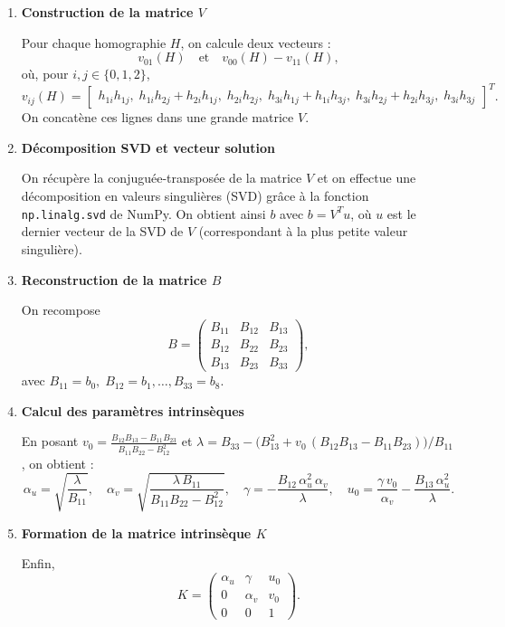 \documentclass[12pt]{article}
\begin{document}
\begin{enumerate}
    \item \textbf{Construction de la matrice \(V\)}

    Pour chaque homographie \(H\), on calcule deux vecteurs :
    \[
        v_{01}(H) \quad\text{et}\quad v_{00}(H) - v_{11}(H),
    \]
    où, pour \(i,j\in\{0,1,2\}\),
    \[
        v_{ij}(H) =
        \begin{bmatrix}
        h_{1i}h_{1j},\;
        h_{1i}h_{2j}+h_{2i}h_{1j},\;
        h_{2i}h_{2j},\;
        h_{3i}h_{1j}+h_{1i}h_{3j},\;
        h_{3i}h_{2j}+h_{2i}h_{3j},\;
        h_{3i}h_{3j}
        \end{bmatrix}^T.
    \]
    On concatène ces lignes dans une grande matrice $V$.
    \linebreak

    \item \textbf{Décomposition SVD et vecteur solution}  
    
    On récupère la conjuguée-transposée de la matrice \(V\) et on effectue une décomposition en valeurs singulières (SVD) grâce à la fonction \texttt{np.linalg.svd} de NumPy.
    On obtient ainsi \(b\) avec \(b = V^T u\), où \(u\) est le dernier vecteur de la SVD de \(V\) (correspondant à la plus petite valeur singulière).
    \linebreak

    \item \textbf{Reconstruction de la matrice \(B\)}  
    
    On recompose
    \[
        B = 
        \begin{pmatrix}
        B_{11} & B_{12} & B_{13} \\
        B_{12} & B_{22} & B_{23} \\
        B_{13} & B_{23} & B_{33}
        \end{pmatrix},
    \]
    avec \(B_{11}=b_0,\;B_{12}=b_1,\ldots,B_{33}=b_8\).
    \linebreak

    \item \textbf{Calcul des paramètres intrinsèques}  
    
    En posant \(v_0=\frac{B_{12}B_{13}-B_{11}B_{23}}{B_{11}B_{22}-B_{12}^2}\) et
    \(\lambda = B_{33} - \bigl(B_{13}^2 + v_0\,(B_{12}B_{13}-B_{11}B_{23})\bigr)/B_{11}\),
    on obtient :
    \[
        \alpha_u = \sqrt{\frac{\lambda}{B_{11}}},\quad
        \alpha_v = \sqrt{\frac{\lambda\,B_{11}}{B_{11}B_{22}-B_{12}^2}},\quad
        \gamma = -\frac{B_{12}\,\alpha_u^2\,\alpha_v}{\lambda},\quad
        u_0 = \frac{\gamma\,v_0}{\alpha_v}-\frac{B_{13}\,\alpha_u^2}{\lambda}.
    \]
    \linebreak

    \item \textbf{Formation de la matrice intrinsèque \(K\)}  
    
    Enfin,
    \[
        K = 
        \begin{pmatrix}
        \alpha_u & \gamma   & u_0 \\
        0        & \alpha_v & v_0 \\
        0        & 0        & 1
        \end{pmatrix}.
    \]
\end{enumerate}
\end{document}

